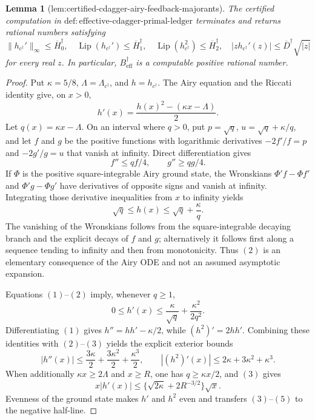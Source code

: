 \documentclass{article}
\newtheorem{lemma}{Lemma}
\begin{document}
{\begin{lemma}[lem:certified-cdagger-airy-feedback-majorants]\label{lem:certified-cdagger-airy-feedback-majorants}
The certified computation in
\(\mathrm{def:effective\text{-}cdagger\text{-}primal\text{-}ledger}\) terminates and returns rational numbers satisfying
\[
\|h_{c^\dagger}'\|_\infty\le\overline H_0^\dagger,
\quad
\operatorname{Lip}(h_{c^\dagger}')\le\overline H_1^\dagger,
\quad
\operatorname{Lip}(h_{c^\dagger}^2)\le\overline H_2^\dagger,
\quad
|zh_{c^\dagger}'(z)|\le\overline D^\dagger\sqrt{|z|}
\]
for every real \(z\).  In particular, \(B_{\mathrm{eff}}^\dagger\) is a computable positive rational number.
\end{lemma}
\begin{proof}
Put \(\kappa=5/8\), \(\Lambda=\Lambda_{c^\dagger}\), and
\(h=h_{c^\dagger}\).  The Airy equation and the Riccati identity give, on \(x>0\),
\[
h'(x)=\frac{h(x)^2-(\kappa x-\Lambda)}2.
\tag{1}
\]
Let \(q(x)=\kappa x-\Lambda\).  On an interval where \(q>0\), put
\(p=\sqrt q\), \(u=\sqrt q+\kappa/q\), and let \(f\) and \(g\) be the positive functions with logarithmic derivatives
\(-2f'/f=p\) and \(-2g'/g=u\) that vanish at infinity.  Direct differentiation gives
\[
f''\le qf/4,\qquad g''\ge qg/4.
\]
If \(\Phi\) is the positive square-integrable Airy ground state, the Wronskians
\(\Phi'f-\Phi f'\) and \(\Phi'g-\Phi g'\) have derivatives of opposite signs and vanish at infinity.  Integrating those derivative inequalities from \(x\) to infinity yields
\[
\sqrt q\le h(x)\le\sqrt q+\frac{\kappa}{q}.
\tag{2}
\]
The vanishing of the Wronskians follows from the square-integrable decaying branch and the explicit decays of \(f\) and \(g\); alternatively it follows first along a sequence tending to infinity and then from monotonicity.  Thus \((2)\) is an elementary consequence of the Airy ODE and not an assumed asymptotic expansion.

Equations \((1)\)--\((2)\) imply, whenever \(q\ge1\),
\[
0\le h'(x)\le\frac{\kappa}{\sqrt q}+\frac{\kappa^2}{2q^2}.
\tag{3}
\]
Differentiating \((1)\) gives
\(h''=hh'-\kappa/2\), while
\((h^2)'=2hh'\).  Combining these identities with \((2)\)--\((3)\) yields the explicit exterior bounds
\[
|h''(x)|\le\frac{3\kappa}{2}+\frac{3\kappa^2}{2}+\frac{\kappa^3}{2},
\qquad
|(h^2)'(x)|\le2\kappa+3\kappa^2+\kappa^3.
\tag{4}
\]
When additionally \(\kappa x\ge2\Lambda\) and \(x\ge R\), one has \(q\ge\kappa x/2\), and \((3)\) gives
\[
x|h'(x)|\le\{\sqrt{2\kappa}+2R^{-3/2}\}\sqrt x.
\tag{5}
\]
Evenness of the ground state makes \(h'\) and \(h^2\) even and transfers \((3)\)--\((5)\) to the negative half-line.


\end{proof}}
\end{document}

